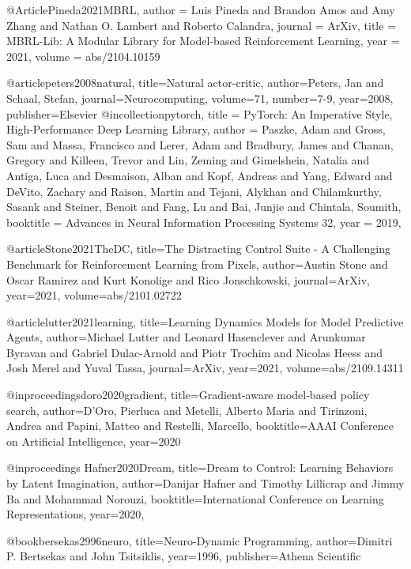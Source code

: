 @Article{Pineda2021MBRL,
  author  = {Luis Pineda and Brandon Amos and Amy Zhang and Nathan O. Lambert and Roberto Calandra},
  journal = {ArXiv},
  title   = {MBRL-Lib: A Modular Library for Model-based Reinforcement Learning},
  year    = {2021},
  volume  = {abs/2104.10159}
}

@article{peters2008natural,
  title={Natural actor-critic},
  author={Peters, Jan and Schaal, Stefan},
  journal={Neurocomputing},
  volume={71},
  number={7-9},
  year={2008},
  publisher={Elsevier}
}
@incollection{pytorch,
title = {PyTorch: An Imperative Style, High-Performance Deep Learning Library},
author = {Paszke, Adam and Gross, Sam and Massa, Francisco and Lerer, Adam and Bradbury, James and Chanan, Gregory and Killeen, Trevor and Lin, Zeming and Gimelshein, Natalia and Antiga, Luca and Desmaison, Alban and Kopf, Andreas and Yang, Edward and DeVito, Zachary and Raison, Martin and Tejani, Alykhan and Chilamkurthy, Sasank and Steiner, Benoit and Fang, Lu and Bai, Junjie and Chintala, Soumith},
booktitle = {Advances in Neural Information Processing Systems 32},
year = {2019},
}

@article{Stone2021TheDC,
  title={The Distracting Control Suite - A Challenging Benchmark for Reinforcement Learning from Pixels},
  author={Austin Stone and Oscar Ramirez and Kurt Konolige and Rico Jonschkowski},
  journal={ArXiv},
  year={2021},
  volume={abs/2101.02722}
}

@article{lutter2021learning,
      title={Learning Dynamics Models for Model Predictive Agents}, 
      author={Michael Lutter and Leonard Hasenclever and Arunkumar Byravan and Gabriel Dulac-Arnold and Piotr Trochim and Nicolas Heess and Josh Merel and Yuval Tassa},
  journal={ArXiv},
  year={2021},
  volume={abs/2109.14311}
}

@inproceedings{doro2020gradient,
  title={Gradient-aware model-based policy search},
  author={D'Oro, Pierluca and Metelli, Alberto Maria and Tirinzoni, Andrea and Papini, Matteo and Restelli, Marcello},
  booktitle={AAAI Conference on Artificial Intelligence},
  year={2020}
}

@inproceedings{
Hafner2020Dream,
title={Dream to Control: Learning Behaviors by Latent Imagination},
author={Danijar Hafner and Timothy Lillicrap and Jimmy Ba and Mohammad Norouzi},
booktitle={International Conference on Learning Representations},
year={2020},
}

@book{bersekas2996neuro,
title={Neuro-Dynamic Programming},
author={Dimitri P. Bertsekas and John Tsitsiklis},
year={1996},
publisher={Athena Scientific}
}

